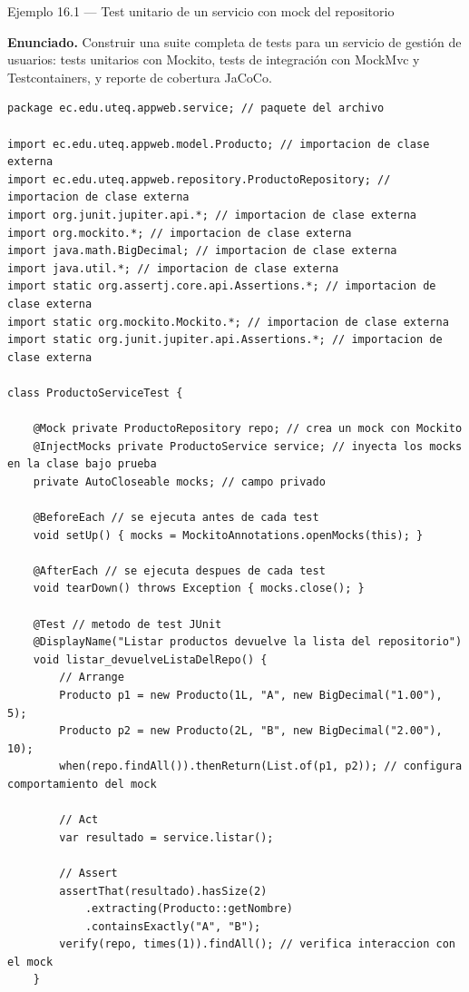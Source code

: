 \begin{cajaejemplo}{Ejemplo 16.1 --- Test unitario de un servicio con mock del repositorio}

\textbf{Enunciado.} Construir una suite completa de tests para un servicio de gestión de usuarios: tests unitarios con Mockito, tests de integración con MockMvc y Testcontainers, y reporte de cobertura JaCoCo.

\begin{lstlisting}[style=java,caption={ProductoServiceTest.java},label=lst:16.1]
package ec.edu.uteq.appweb.service; // paquete del archivo

import ec.edu.uteq.appweb.model.Producto; // importacion de clase externa
import ec.edu.uteq.appweb.repository.ProductoRepository; // importacion de clase externa
import org.junit.jupiter.api.*; // importacion de clase externa
import org.mockito.*; // importacion de clase externa
import java.math.BigDecimal; // importacion de clase externa
import java.util.*; // importacion de clase externa
import static org.assertj.core.api.Assertions.*; // importacion de clase externa
import static org.mockito.Mockito.*; // importacion de clase externa
import static org.junit.jupiter.api.Assertions.*; // importacion de clase externa

class ProductoServiceTest {

    @Mock private ProductoRepository repo; // crea un mock con Mockito
    @InjectMocks private ProductoService service; // inyecta los mocks en la clase bajo prueba
    private AutoCloseable mocks; // campo privado

    @BeforeEach // se ejecuta antes de cada test
    void setUp() { mocks = MockitoAnnotations.openMocks(this); }

    @AfterEach // se ejecuta despues de cada test
    void tearDown() throws Exception { mocks.close(); }

    @Test // metodo de test JUnit
    @DisplayName("Listar productos devuelve la lista del repositorio")
    void listar_devuelveListaDelRepo() {
        // Arrange
        Producto p1 = new Producto(1L, "A", new BigDecimal("1.00"), 5);
        Producto p2 = new Producto(2L, "B", new BigDecimal("2.00"), 10);
        when(repo.findAll()).thenReturn(List.of(p1, p2)); // configura comportamiento del mock

        // Act
        var resultado = service.listar();

        // Assert
        assertThat(resultado).hasSize(2)
            .extracting(Producto::getNombre)
            .containsExactly("A", "B");
        verify(repo, times(1)).findAll(); // verifica interaccion con el mock
    }


\end{lstlisting}
\end{cajaejemplo}
